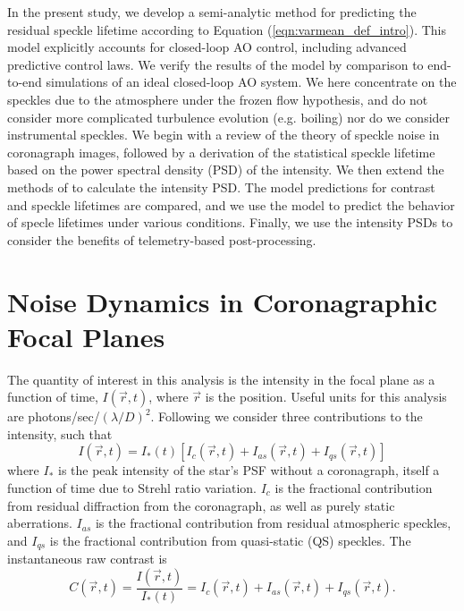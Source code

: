 \documentclass[11pt,preprint]{aastex}
\begin{document}
In the present study, we develop a semi-analytic method for predicting the residual speckle lifetime according to Equation (\ref{eqn:varmean_def_intro}).  This model explicitly accounts for closed-loop AO control, including advanced predictive control laws.  We verify the results of the model by comparison to end-to-end simulations of an ideal closed-loop AO system.  We here concentrate on the speckles due to the atmosphere under the frozen flow hypothesis, and do not consider more complicated turbulence evolution (e.g. boiling) nor do we consider instrumental speckles. We begin with a review of the theory of speckle noise in coronagraph images, followed by a derivation of the statistical speckle lifetime based on the power spectral density (PSD) of the intensity.  We then extend the methods of \citet{2018JATIS...4a9001M} to calculate the intensity PSD.  The model predictions for contrast and speckle lifetimes are compared, and we use the model to predict the behavior of specle lifetimes under various conditions.  Finally, we use the intensity PSDs to consider the benefits of telemetry-based post-processing.


\section{Noise Dynamics in Coronagraphic Focal Planes}

The quantity of interest in this analysis is the intensity in the focal plane as a function of time, $I(\vec{r}, t)$, where $\vec{r}$ is the position.  Useful units for this analysis are photons/sec/$(\lambda/D)^2$.  Following \citet{2007ApJ...669..642S} we consider three contributions to the intensity, such that
\begin{equation}
I(\vec{r},t) = I_{*}(t)\left[I_c(\vec{r},t) + I_{as}(\vec{r},t) + I_{qs}(\vec{r},t)\right]
\end{equation}
where $I_{*}$ is the peak intensity of the star's PSF without a coronagraph, itself a function of time due to Strehl ratio variation.  $I_c$ is the fractional contribution from residual diffraction from the coronagraph, as well as purely static aberrations.  $I_{as}$ is the fractional contribution from residual atmospheric speckles, and $I_{qs}$ is the fractional contribution from quasi-static (QS) speckles.  The instantaneous raw contrast is
\begin{equation}
C(\vec{r},t) = \frac{I(\vec{r},t)}{I_*(t)} = I_c(\vec{r},t) + I_{as}(\vec{r},t) + I_{qs}(\vec{r},t).
\end{equation}
\end{document}
